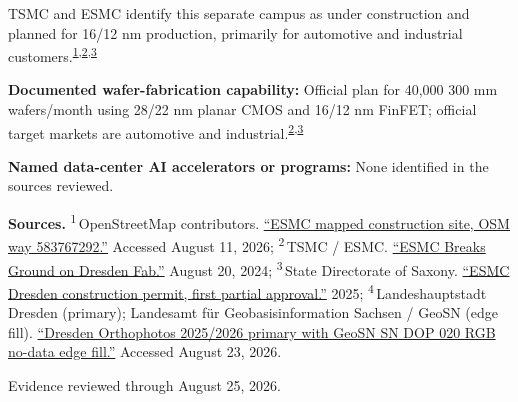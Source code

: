 \begin{minipage}[t][0.90\textheight][t]{\textwidth}
\begin{minipage}[t]{\textwidth}
\begin{minipage}[t]{0.32\textwidth}
\medskip
{\footnotesize TSMC and ESMC identify this separate campus as under construction and planned for 16/12 nm production, primarily for automotive and industrial customers.\nobreak\textsuperscript{\href{\detokenize{https://www.openstreetmap.org/way/583767292}}{\textcolor{accent}{1}},\href{\detokenize{https://pr.tsmc.com/english/news/3169}}{\textcolor{accent}{2}},\href{\detokenize{https://www.lds.sachsen.de/bekanntmachung/anlagen/ESMC_Bescheid_1._TG_geschw_LDS.pdf}}{\textcolor{accent}{3}}}\par}
\medskip
{\footnotesize\textbf{Documented wafer-fabrication capability:} Official plan for 40,000 300 mm wafers/month using 28/22 nm planar CMOS and 16/12 nm FinFET; official target markets are automotive and industrial.\nobreak\textsuperscript{\href{\detokenize{https://pr.tsmc.com/english/news/3169}}{\textcolor{accent}{2}},\href{\detokenize{https://www.lds.sachsen.de/bekanntmachung/anlagen/ESMC_Bescheid_1._TG_geschw_LDS.pdf}}{\textcolor{accent}{3}}}\par}
\end{minipage}
\end{minipage}
\par\vspace{0.65em}
\medskip
{\footnotesize\textbf{Named data-center AI accelerators or programs:} None identified in the sources reviewed.\par}
\medskip
{\sffamily\scriptsize\setlength{\emergencystretch}{1.5em}\textbf{Sources.} \textsuperscript{1}\,OpenStreetMap contributors. \href{\detokenize{https://www.openstreetmap.org/way/583767292}}{\enquote{ESMC mapped construction site, OSM way 583767292.}} Accessed August 11, 2026; \textsuperscript{2}\,TSMC / ESMC. \href{\detokenize{https://pr.tsmc.com/english/news/3169}}{\enquote{ESMC Breaks Ground on Dresden Fab.}} August 20, 2024; \textsuperscript{3}\,State Directorate of Saxony. \href{\detokenize{https://www.lds.sachsen.de/bekanntmachung/anlagen/ESMC_Bescheid_1._TG_geschw_LDS.pdf}}{\enquote{ESMC Dresden construction permit, first partial approval.}} 2025; \textsuperscript{4}\,Landeshauptstadt Dresden (primary); Landesamt für Geobasisinformation Sachsen / GeoSN (edge fill). \href{\detokenize{https://stadtplan.dresden.de/public/ogcsl.ashx?SERVICE=WMTS&REQUEST=GetCapabilities&VERSION=1.0.0&PKGID=4}}{\enquote{Dresden Orthophotos 2025/2026 primary with GeoSN SN DOP 020 RGB no-data edge fill.}} Accessed August 23, 2026.\par}
\vfill
\noindent{\color{hairline}\rule{\linewidth}{0.4pt}}\par\smallskip
{\sffamily\scriptsize\color{black!58} Evidence reviewed through August 25, 2026.\par}
\end{minipage}
